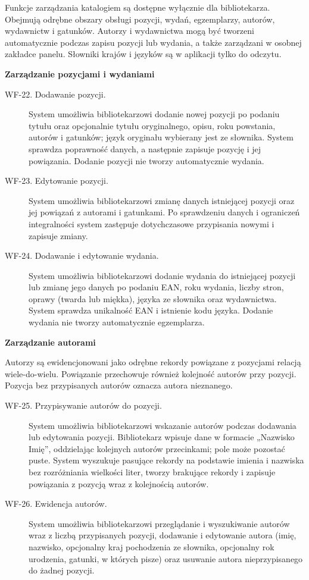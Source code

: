 \documentclass[11pt, a4paper]{article}
\begin{document}
Funkcje zarządzania katalogiem są dostępne wyłącznie dla bibliotekarza. Obejmują odrębne obszary obsługi pozycji, wydań, egzemplarzy, autorów, wydawnictw i gatunków. Autorzy i wydawnictwa mogą być tworzeni automatycznie podczas zapisu pozycji lub wydania, a także zarządzani w osobnej zakładce panelu. Słowniki krajów i języków są w aplikacji tylko do odczytu.

\noindent\textbf{Zarządzanie pozycjami i wydaniami}

\begin{description}
\item[WF-22. Dodawanie pozycji.] System umożliwia bibliotekarzowi dodanie nowej pozycji po podaniu tytułu oraz opcjonalnie tytułu oryginalnego, opisu, roku powstania, autorów i gatunków; język oryginału wybierany jest ze słownika. System sprawdza poprawność danych, a następnie zapisuje pozycję i jej powiązania. Dodanie pozycji nie tworzy automatycznie wydania.
\item[WF-23. Edytowanie pozycji.] System umożliwia bibliotekarzowi zmianę danych istniejącej pozycji oraz jej powiązań z autorami i gatunkami. Po sprawdzeniu danych i ograniczeń integralności system zastępuje dotychczasowe przypisania nowymi i zapisuje zmiany.
\item[WF-24. Dodawanie i edytowanie wydania.] System umożliwia bibliotekarzowi dodanie wydania do istniejącej pozycji lub zmianę jego danych po podaniu EAN, roku wydania, liczby stron, oprawy (twarda lub miękka), języka ze słownika oraz wydawnictwa. System sprawdza unikalność EAN i istnienie kodu języka. Dodanie wydania nie tworzy automatycznie egzemplarza.
\end{description}

\noindent\textbf{Zarządzanie autorami}

Autorzy są ewidencjonowani jako odrębne rekordy powiązane z pozycjami relacją wiele-do-wielu. Powiązanie przechowuje również kolejność autorów przy pozycji. Pozycja bez przypisanych autorów oznacza autora nieznanego.

\begin{description}
\item[WF-25. Przypisywanie autorów do pozycji.] System umożliwia bibliotekarzowi wskazanie autorów podczas dodawania lub edytowania pozycji. Bibliotekarz wpisuje dane w formacie „Nazwisko Imię”, oddzielając kolejnych autorów przecinkami; pole może pozostać puste. System wyszukuje pasujące rekordy na podstawie imienia i nazwiska bez rozróżniania wielkości liter, tworzy brakujące rekordy i zapisuje powiązania z pozycją wraz z kolejnością autorów.
\item[WF-26. Ewidencja autorów.] System umożliwia bibliotekarzowi przeglądanie i wyszukiwanie autorów wraz z liczbą przypisanych pozycji, dodawanie i edytowanie autora (imię, nazwisko, opcjonalny kraj pochodzenia ze słownika, opcjonalny rok urodzenia, gatunki, w których pisze) oraz usuwanie autora nieprzypisanego do żadnej pozycji.
\end{description}
\end{document}
